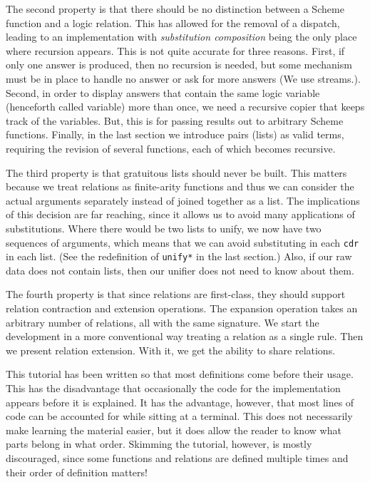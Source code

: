 The second property is that there should be no distinction between a Scheme
function and a logic relation.  This has allowed for the removal of a dispatch,
leading to an implementation with \emph{substitution composition} being the
only place where recursion appears.  This is not quite accurate for three
reasons.  First, if only one answer is produced, then no recursion is needed,
but some mechanism must be in place to handle no answer or ask for more answers
(We use streams.).  Second, in order to display answers that contain the same
logic variable (henceforth called variable) more than once, we need a recursive
copier that keeps track of the variables.  But, this is for passing results out
to arbitrary Scheme functions.  Finally, in the last section we introduce pairs
(lists) as valid terms, requiring the revision of several functions, each of
which becomes recursive.

The third property is that gratuitous lists should never be built.  This
matters because we treat relations as finite-arity functions and thus we can
consider the actual arguments separately instead of joined together as a list.
The implications of this decision are far reaching, since it allows us to avoid
many applications of substitutions.  Where there would be two lists to unify,
we now have two sequences of arguments, which means that we can avoid
substituting in each \texttt{cdr} in each list. (See the redefinition of
\texttt{unify*} in the last section.)  Also, if our raw data does not contain
lists, then our unifier does not need to know about them.

The fourth property is that since relations are first-class, they should
support relation contraction and extension operations.  The expansion operation
takes an arbitrary number of relations, all with the same signature.  We start
the development in a more conventional way treating a relation as a single
rule.  Then we present relation extension.  With it, we get the ability to
share relations.

This tutorial has been written so that most definitions come before
their usage.  This has the disadvantage that occasionally the code for
the implementation appears before it is explained.  It has the
advantage, however, that most lines of code can be accounted for while
sitting at a terminal.  This does not necessarily make learning the
material easier, but it does allow the reader to know what parts
belong in what order.  Skimming the tutorial, however, is mostly
discouraged, since some functions and relations are defined multiple
times and their order of definition matters!

